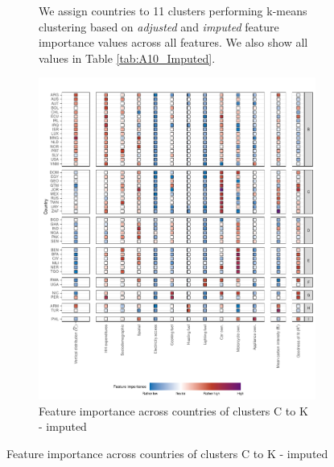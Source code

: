 \begin{figure}[ht!]
\begin{subfigure}[b]{\textwidth}
\begin{subcaption2}
    We assign countries to 11 clusters performing k-means clustering based on \textit{adjusted} and \textit{imputed} feature importance values across all features. We also show all values in Table \ref{tab:A10_Imputed}.
    \end{subcaption2}
    \end{subfigure}
    
\end{figure}
\clearpage

\clearpage
\begin{figure}[ht!]\ContinuedFloat
    \centering
    \begin{subfigure}[b]{\textwidth}
    \centering
    \includegraphics{Figure 4/Figure_4_Corrected_Imputed_2.pdf}
    \caption{Feature importance across countries of clusters C to K - imputed}\label{fig:fig_4_2_imputed}
    \begin{subcaption2}

\end{subcaption2}
\end{subfigure}
\end{figure}
